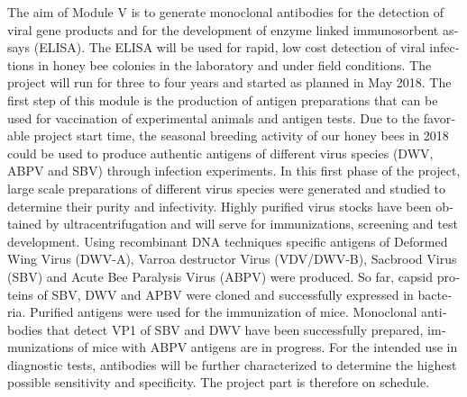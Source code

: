 \begin{otherlanguage}{english}
The aim of Module V is to generate monoclonal antibodies for the detection of viral gene products and for the development of enzyme linked immunosorbent assays (ELISA). The ELISA will be used for rapid, low cost detection of viral infections in honey bee colonies in the laboratory and under field conditions. The project will run for three to four years and started as planned in May 2018. The first step of this module is the production of antigen preparations that can be used for vaccination of experimental animals and antigen tests. Due to the favorable project start time, the seasonal breeding activity of our honey bees in 2018 could be used to produce authentic antigens of different virus species (DWV, ABPV and SBV) through infection experiments. In this first phase of the project, large scale preparations of different virus species were generated and studied to determine their purity and infectivity. Highly purified virus stocks have been obtained by ultracentrifugation and will serve for immunizations, screening and test development. Using recombinant DNA techniques specific antigens of Deformed Wing Virus (DWV-A), Varroa destructor Virus (VDV/DWV-B), Sacbrood Virus (SBV) and Acute Bee Paralysis Virus (ABPV) were produced. So far, capsid proteins of SBV, DWV and APBV were cloned and successfully expressed in bacteria. Purified antigens were used for the immunization of mice. Monoclonal antibodies that detect VP1 of SBV and DWV have been successfully prepared, immunizations of mice with ABPV antigens are in progress.  For the intended use in diagnostic tests, antibodies will be further characterized to determine the highest possible sensitivity and specificity.
The project part is therefore on schedule.

\end{otherlanguage}
